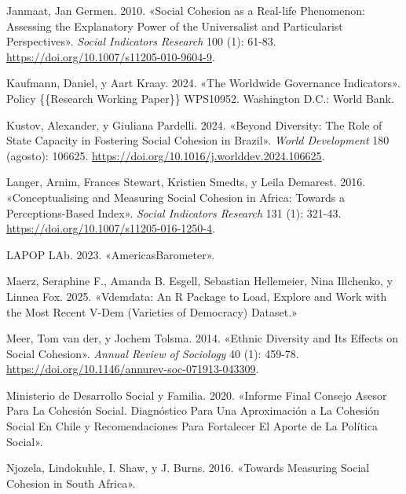 \documentclass[
  spanish,
  letterpaper,
  DIV=11,
  numbers=noendperiod]{scrartcl}
\newlength{\cslhangindent}
\newenvironment{CSLReferences}[2] %
 {\begin{list}{}{%
  \setlength{\itemindent}{0pt}
  \setlength{\leftmargin}{0pt}
  \setlength{\parsep}{0pt}
  \ifodd #1
   \setlength{\leftmargin}{\cslhangindent}
   \setlength{\itemindent}{-1\cslhangindent}
  \fi
  \setlength{\itemsep}{#2\baselineskip}}}
 {\end{list}}
\begin{document}
\begin{CSLReferences}{1}{0}
Janmaat, Jan Germen. 2010. {«Social {Cohesion} as a {Real-life
Phenomenon}: {Assessing} the {Explanatory Power} of the {Universalist}
and {Particularist Perspectives}»}. \emph{Social Indicators Research}
100 (1): 61-83. \url{https://doi.org/10.1007/s11205-010-9604-9}.

Kaufmann, Daniel, y Aart Kraay. 2024. {«The {Worldwide Governance
Indicators}»}. Policy \{\{Research Working Paper\}\} WPS10952.
Washington D.C.: World Bank.

Kustov, Alexander, y Giuliana Pardelli. 2024. {«Beyond {Diversity}: {The
Role} of {State Capacity} in {Fostering Social Cohesion} in {Brazil}»}.
\emph{World Development} 180 (agosto): 106625.
\url{https://doi.org/10.1016/j.worlddev.2024.106625}.

Langer, Arnim, Frances Stewart, Kristien Smedts, y Leila Demarest. 2016.
{«Conceptualising and {Measuring Social Cohesion} in {Africa}: {Towards}
a {Perceptions-Based Index}»}. \emph{Social Indicators Research} 131
(1): 321-43. \url{https://doi.org/10.1007/s11205-016-1250-4}.

LAPOP LAb. 2023. {«{AmericasBarometer}»}.

Maerz, Seraphine F., Amanda B. Esgell, Sebastian Hellemeier, Nina
Illchenko, y Linnea Fox. 2025. {«Vdemdata: {An R} Package to Load,
Explore and Work with the Most Recent {V-Dem} ({Varieties} of
{Democracy}) Dataset.»}

Meer, Tom van der, y Jochem Tolsma. 2014. {«Ethnic {Diversity} and {Its
Effects} on {Social Cohesion}»}. \emph{Annual Review of Sociology} 40
(1): 459-78. \url{https://doi.org/10.1146/annurev-soc-071913-043309}.

Ministerio de Desarrollo Social y Familia. 2020. {«Informe {Final
Consejo Asesor} Para La {Cohesi{ó}n Social}. {Diagn{ó}stico} Para Una
Aproximaci{ó}n a La Cohesi{ó}n Social En {Chile} y Recomendaciones Para
Fortalecer El Aporte de La Pol{í}tica Social»}.

Njozela, Lindokuhle, I. Shaw, y J. Burns. 2016. {«Towards Measuring
Social Cohesion in {South Africa}»}.


\end{CSLReferences}
\end{document}
